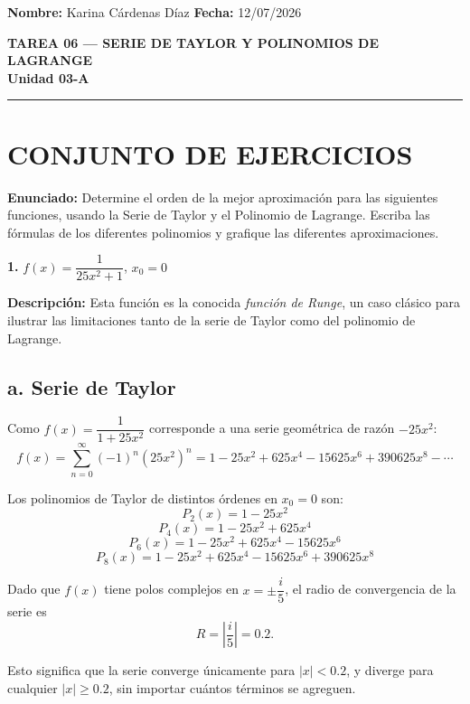 \documentclass[12pt,a4paper]{article}
\begin{document}
\vspace*{0.5cm}

\textbf{Nombre:} Karina C\'ardenas D\'iaz \hfill \textbf{Fecha:} 12/07/2026

\vspace{0.3cm}
\begin{center}
  \textbf{\large TAREA 06 --- SERIE DE TAYLOR Y POLINOMIOS DE LAGRANGE}\\[2pt]
  \textbf{Unidad 03-A}
\end{center}
\vspace{0.2cm}

\hrule
\vspace{0.4cm}

\section*{CONJUNTO DE EJERCICIOS}

\textbf{Enunciado:} Determine el orden de la mejor aproximaci\'on para las siguientes funciones, usando la Serie de Taylor y el Polinomio de Lagrange. Escriba las f\'ormulas de los diferentes polinomios y grafique las diferentes aproximaciones.

\textbf{1.} $f(x) = \dfrac{1}{25x^2+1}$, $x_0 = 0$

\textbf{Descripci\'on:} Esta funci\'on es la conocida \emph{funci\'on de Runge}, un caso cl\'asico para ilustrar las limitaciones tanto de la serie de Taylor como del polinomio de Lagrange.

\subsection*{a. Serie de Taylor}

Como $f(x) = \dfrac{1}{1+25x^2}$ corresponde a una serie geom\'etrica de raz\'on $-25x^2$:
\[
f(x) = \sum_{n=0}^{\infty} (-1)^n (25x^2)^n = 1 - 25x^2 + 625x^4 - 15625x^6 + 390625x^8 - \cdots
\]

Los polinomios de Taylor de distintos \'ordenes en $x_0=0$ son:
\[
P_2(x) = 1 - 25x^2
\]
\[
P_4(x) = 1 - 25x^2 + 625x^4
\]
\[
P_6(x) = 1 - 25x^2 + 625x^4 - 15625x^6
\]
\[
P_8(x) = 1 - 25x^2 + 625x^4 - 15625x^6 + 390625x^8
\]

Dado que $f(x)$ tiene polos complejos en $x = \pm \dfrac{i}{5}$, el radio de convergencia de la serie es
\[
R = \left|\frac{i}{5}\right| = 0.2.
\]

Esto significa que la serie converge \'unicamente para $|x| < 0.2$, y diverge para cualquier $|x| \geq 0.2$, sin importar cu\'antos t\'erminos se agreguen.
\end{document}
